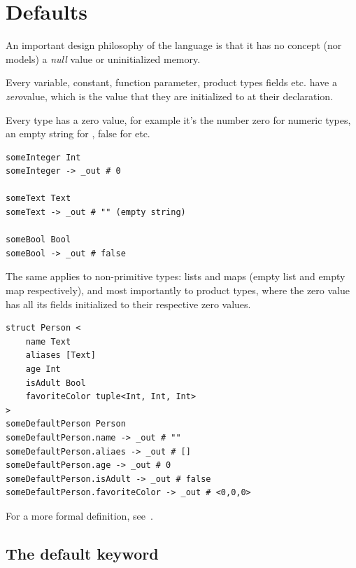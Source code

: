 \chapter{Defaults}
\label{ch:defaults}

An important design philosophy of the language is that it has no concept (nor
models) a \emph{null} value or uninitialized memory.

Every variable, constant, function parameter, product types fields etc. have a
\emph{zero}\footnotemark[1] value, which is the value that they are initialized
to at their declaration.


Every type has a zero value, for example it's the number zero for numeric
types, an empty string for , false for  etc.

\begin{verbatim}
someInteger Int
someInteger -> _out # 0

someText Text
someText -> _out # "" (empty string)

someBool Bool
someBool -> _out # false
\end{verbatim}

The same applies to non-primitive types: lists and maps (empty list and empty
map respectively), and most importantly to product types, where the zero value
has all its fields initialized to their respective zero values.

\begin{listing}
	\label{lst:product_type_zero_value}
	\caption{
		Example of a variable being initialized with the zero value of its
		product type
	}
	\begin{verbatim}
struct Person <
	name Text
	aliases [Text]
	age Int
	isAdult Bool
	favoriteColor tuple<Int, Int, Int>
>
someDefaultPerson Person
someDefaultPerson.name -> _out # ""
someDefaultPerson.aliaes -> _out # []
someDefaultPerson.age -> _out # 0
someDefaultPerson.isAdult -> _out # false
someDefaultPerson.favoriteColor -> _out # <0,0,0>
	\end{verbatim}
\end{listing}

For a more formal definition, see~.

\clearpage

\section{The default keyword}

